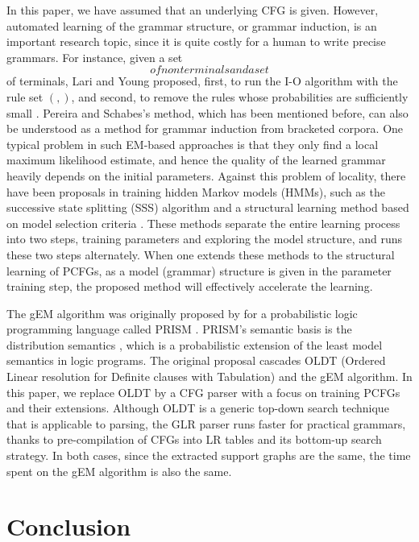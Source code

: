 \documentclass[english]{jnlp_1.4_rep}
\newcommand{\Vn}{}
\newcommand{\Vt}{}
\newcommand{\Rmax}{}
\begin{document}
In this paper, we have assumed that an underlying CFG is given.
However, automated learning of the grammar structure, or grammar induction,
is an important research topic, since it is quite costly
for a human to write precise grammars.  For instance,
given a set $\Vn$ of nonterminals and a set $\Vt$ of terminals,
Lari and Young proposed, first, to run the I-O algorithm with
the rule set $\Rmax(\Vn,\Vt)$, and second, to remove the rules
whose probabilities are sufficiently small \cite{Lari90}.
Pereira and Schabes's \citeyear{Pereira92} method,
which has been mentioned before, can also be understood as a method
for grammar induction from bracketed corpora.
One typical problem in such EM-based approaches is that they
only find a local maximum likelihood estimate, and hence the
quality of the learned grammar heavily depends on the initial parameters.
Against this problem of locality, there have been proposals
in training hidden Markov models (HMMs), such as
the successive state splitting (SSS) algorithm \cite{Takami93} and a structural learning method
based on model selection criteria \cite{Ikeda95}.
These methods separate the entire learning process into
two steps, training parameters and exploring the model structure,
and runs these two steps alternately.
When one extends these methods to the structural learning of PCFGs,
as a model (grammar) structure is given in the parameter training step,
the proposed method will effectively accelerate the learning.

The gEM algorithm was originally proposed by 
for a probabilistic logic programming language called PRISM \cite{Sato97}.
PRISM's semantic basis is the distribution semantics \cite{Sato95},
which is a probabilistic extension of the least model semantics
in logic programs.  The original proposal cascades
OLDT (Ordered Linear resolution for Definite clauses with Tabulation)
\cite{Tamaki86} and the gEM algorithm.  In this paper,
we replace OLDT by a CFG parser with a focus on training PCFGs and
their extensions.  
Although OLDT is a generic top-down search technique that is
applicable to parsing, the GLR parser runs faster for
practical grammars, thanks to pre-compilation
of CFGs into LR tables and its bottom-up search strategy.
In both cases, since the extracted support graphs are the same,
the time spent on the gEM algorithm is also the same.


\section{Conclusion}
\label{sec:conclusion}
\end{document}
